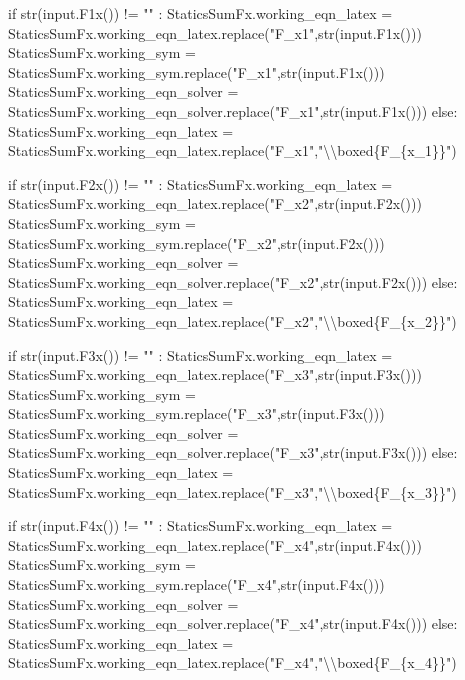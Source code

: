 \documentclass[
  letterpaper,
  DIV=11,
  numbers=noendperiod]{scrreprt}
\newenvironment{Shaded}{\begin{snugshade}}{\end{snugshade}}
\newcommand{\NormalTok}[1]{\textcolor[rgb]{0.00,0.23,0.31}{#1}}
\begin{document}
\begin{Shaded}
\begin{Highlighting}[]
\NormalTok{            if str(input.F1x()) != "" : }
\NormalTok{                StaticsSumFx.working\_eqn\_latex = StaticsSumFx.working\_eqn\_latex.replace("F\_x1",str(input.F1x()))}
\NormalTok{                StaticsSumFx.working\_sym = StaticsSumFx.working\_sym.replace("F\_x1",str(input.F1x()))}
\NormalTok{                StaticsSumFx.working\_eqn\_solver = StaticsSumFx.working\_eqn\_solver.replace("F\_x1",str(input.F1x()))}
\NormalTok{            else:}
\NormalTok{                StaticsSumFx.working\_eqn\_latex = StaticsSumFx.working\_eqn\_latex.replace("F\_x1","\textbackslash{}\textbackslash{}boxed\{F\_\{x\_1\}\}")}
        
\NormalTok{            if str(input.F2x()) != "" : }
\NormalTok{                StaticsSumFx.working\_eqn\_latex = StaticsSumFx.working\_eqn\_latex.replace("F\_x2",str(input.F2x()))}
\NormalTok{                StaticsSumFx.working\_sym = StaticsSumFx.working\_sym.replace("F\_x2",str(input.F2x()))}
\NormalTok{                StaticsSumFx.working\_eqn\_solver = StaticsSumFx.working\_eqn\_solver.replace("F\_x2",str(input.F2x()))}
\NormalTok{            else:}
\NormalTok{                StaticsSumFx.working\_eqn\_latex = StaticsSumFx.working\_eqn\_latex.replace("F\_x2","\textbackslash{}\textbackslash{}boxed\{F\_\{x\_2\}\}")}
        
\NormalTok{            if str(input.F3x()) != "" : }
\NormalTok{                StaticsSumFx.working\_eqn\_latex = StaticsSumFx.working\_eqn\_latex.replace("F\_x3",str(input.F3x()))}
\NormalTok{                StaticsSumFx.working\_sym = StaticsSumFx.working\_sym.replace("F\_x3",str(input.F3x()))}
\NormalTok{                StaticsSumFx.working\_eqn\_solver = StaticsSumFx.working\_eqn\_solver.replace("F\_x3",str(input.F3x()))}
\NormalTok{            else:}
\NormalTok{                StaticsSumFx.working\_eqn\_latex = StaticsSumFx.working\_eqn\_latex.replace("F\_x3","\textbackslash{}\textbackslash{}boxed\{F\_\{x\_3\}\}")}
        
\NormalTok{            if str(input.F4x()) != "" : }
\NormalTok{                StaticsSumFx.working\_eqn\_latex = StaticsSumFx.working\_eqn\_latex.replace("F\_x4",str(input.F4x()))}
\NormalTok{                StaticsSumFx.working\_sym = StaticsSumFx.working\_sym.replace("F\_x4",str(input.F4x()))}
\NormalTok{                StaticsSumFx.working\_eqn\_solver = StaticsSumFx.working\_eqn\_solver.replace("F\_x4",str(input.F4x()))}
\NormalTok{            else:}
\NormalTok{                StaticsSumFx.working\_eqn\_latex = StaticsSumFx.working\_eqn\_latex.replace("F\_x4","\textbackslash{}\textbackslash{}boxed\{F\_\{x\_4\}\}")}
        

\end{Highlighting}
\end{Shaded}
\end{document}
